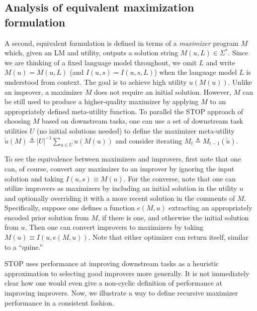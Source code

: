 \documentclass{article} %
\newcommand{\maxutil}{{\tilde{u}}}
\newcommand{\sol}{{s}}
\newcommand{\defeq}{\triangleq}
\begin{document}
\subsection{Analysis of equivalent maximization formulation}\label{sec:max}


%
A second, equivalent formulation is defined in terms of a \emph{maximizer} program $M$ which, given an LM and utility, outputs a solution string $M(u, L) \in \Sigma^*$. Since we are thinking of a fixed language model throughout, we omit $L$ and write $M(u) = M(u, L)$ (and $I(u, \sol) = I(u, \sol, L)$) when the language model $L$ is understood from context. The goal is to achieve high utility $u(M(u))$. %
Unlike an improver, a maximizer $M$ does not require an initial solution. However, $M$ can be still used to produce a higher-quality maximizer by applying $M$ to an appropriately defined meta-utility function.  To parallel the STOP  approach of choosing $M$ based on downstream tasks, one can use a set of downstream task utilities $U$ (no initial solutions needed) 
to define the maximizer meta-utility
$\maxutil(M)\defeq |U|^{-1}\sum_{u\in U}u(M(u))$ 
and consider iterating $M_t\defeq M_{t-1}(\maxutil).$ 

To see the equivalence between maximizers and improvers, first note that one can, of course, convert any maximizer to an improver by ignoring the input solution and taking $I(u, \sol)\equiv M(u)$. For the converse, note that one can utilize improvers as maximizers by including an initial solution in the utility $u$ and optionally overriding it with a more recent solution in the comments of $M$. Specifically, suppose one defines a function $e(M, u)$ extracting an appropriately encoded prior solution from $M$, if there is one, and otherwise the initial solution from $u$. Then one can convert improvers to maximizers by taking $M(u) \equiv I(u, e(M, u))$. Note that either optimizer can return itself, similar to a ``quine.'' 

%

STOP uses performance at improving downstream tasks as a heuristic approximation to selecting good improvers more generally. It is not immediately clear how one would even give a non-cyclic definition of performance at improving improvers. Now, we illustrate a way to define recursive maximizer performance in a consistent fashion. 

%
%
%
\end{document}
